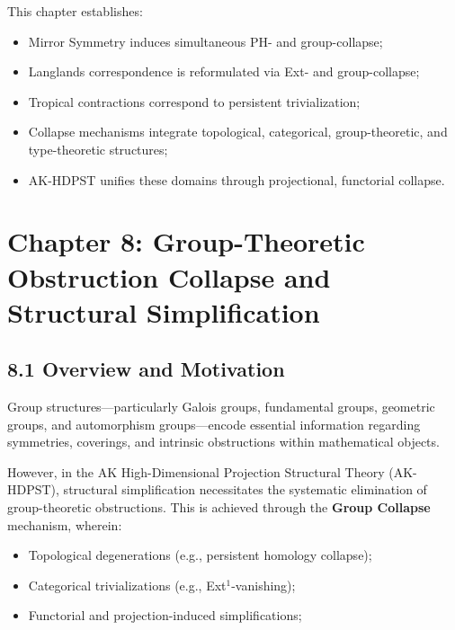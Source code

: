 \documentclass[11pt]{article}
\begin{document}
This chapter establishes:

\begin{itemize}
    \item Mirror Symmetry induces simultaneous PH- and group-collapse;
    \item Langlands correspondence is reformulated via Ext- and group-collapse;
    \item Tropical contractions correspond to persistent trivialization;
    \item Collapse mechanisms integrate topological, categorical, group-theoretic, and type-theoretic structures;
    \item AK-HDPST unifies these domains through projectional, functorial collapse.
\end{itemize}



\section{Chapter 8: Group-Theoretic Obstruction Collapse and Structural Simplification}

\subsection*{8.1 Overview and Motivation}

Group structures—particularly Galois groups, fundamental groups, geometric groups, and automorphism groups—encode essential information regarding symmetries, coverings, and intrinsic obstructions within mathematical objects.

However, in the AK High-Dimensional Projection Structural Theory (AK-HDPST), structural simplification necessitates the systematic elimination of group-theoretic obstructions. This is achieved through the \textbf{Group Collapse} mechanism, wherein:

\begin{itemize}
    \item Topological degenerations (e.g., persistent homology collapse);
    \item Categorical trivializations (e.g., Ext$^1$-vanishing);
    \item Functorial and projection-induced simplifications;
\end{itemize}
\end{document}
